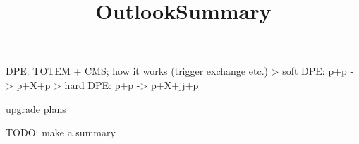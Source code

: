 \> DPE: TOTEM + CMS; how it works (trigger exchange etc.)
\>> soft DPE: p+p -> p+X+p
\>> hard DPE: p+p -> p+X+jj+p

\newpage %
\title{}


\newpage %
\hbox{}
\vfil
\title{Outlook}


\newpage %
\title{}

\> upgrade plans

\newpage %
\title{}


\newpage %
\title{Summary}

TODO: make a summary

\vfil
\eject
\bye
